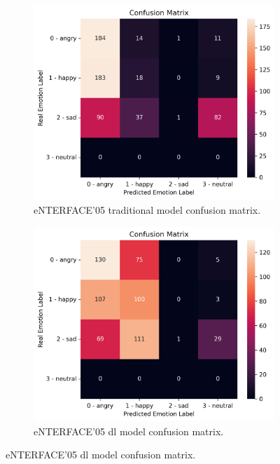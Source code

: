 \begin{figure}[H]
	\begin{subfigure}{.5\textwidth}
		\centering
		\includegraphics[width=\linewidth]{figs/4_5_discussion/ent_trad_cm.png}
		\caption{eNTERFACE'05 traditional model confusion matrix.}
	\end{subfigure}%
	\begin{subfigure}{.5\textwidth}
		\centering
		\includegraphics[width=\linewidth]{figs/4_5_discussion/ent_deep_cm.png}
		\caption{eNTERFACE'05 \ac{dl} model confusion matrix.}
	\end{subfigure}

\end{figure}
